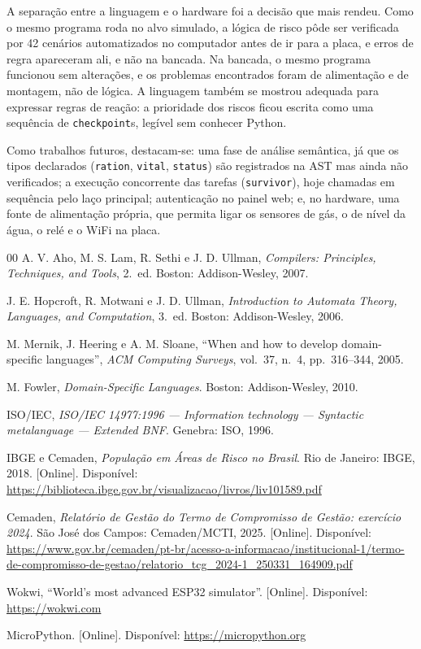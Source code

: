 \documentclass[conference]{IEEEtran}
\begin{document}
A separação entre a linguagem e o hardware foi a decisão que mais rendeu.
Como o mesmo programa roda no alvo simulado, a lógica de risco pôde ser
verificada por 42 cenários automatizados no computador antes de ir para
a placa, e erros de regra apareceram ali, e não na bancada. Na bancada, o mesmo
programa funcionou sem alterações, e os problemas encontrados foram de
alimentação e de montagem, não de lógica. A linguagem
também se mostrou adequada para expressar regras de reação: a prioridade
dos riscos ficou escrita como uma sequência de \texttt{checkpoint}s, legível
sem conhecer Python.

Como trabalhos futuros, destacam-se: uma fase de análise semântica, já que
os tipos declarados (\texttt{ration}, \texttt{vital}, \texttt{status}) são
registrados na AST mas ainda não verificados; a execução concorrente das
tarefas (\texttt{survivor}), hoje chamadas em sequência pelo laço
principal; autenticação no painel web; e, no hardware, uma fonte de
alimentação própria, que permita ligar os sensores de gás, o de nível da
água, o relé e o WiFi na placa.

\begin{thebibliography}{00}
 A. V. Aho, M. S. Lam, R. Sethi e J. D. Ullman,
\textit{Compilers: Principles, Techniques, and Tools}, 2.\ ed.
Boston: Addison-Wesley, 2007.

 J. E. Hopcroft, R. Motwani e J. D. Ullman,
\textit{Introduction to Automata Theory, Languages, and Computation},
3.\ ed. Boston: Addison-Wesley, 2006.

 M. Mernik, J. Heering e A. M. Sloane, ``When and
how to develop domain-specific languages'', \textit{ACM Computing
Surveys}, vol.~37, n.~4, pp.~316--344, 2005.

 M. Fowler, \textit{Domain-Specific Languages}.
Boston: Addison-Wesley, 2010.

 ISO/IEC, \textit{ISO/IEC 14977:1996 --- Information
technology --- Syntactic metalanguage --- Extended BNF}. Genebra: ISO,
1996.

 IBGE e Cemaden, \textit{População em Áreas de Risco no
Brasil}. Rio de Janeiro: IBGE, 2018. [Online]. Disponível:
\url{https://biblioteca.ibge.gov.br/visualizacao/livros/liv101589.pdf}

 Cemaden, \textit{Relatório de Gestão do Termo de
Compromisso de Gestão: exercício 2024}. São José dos Campos: Cemaden/MCTI,
2025. [Online]. Disponível:
\url{https://www.gov.br/cemaden/pt-br/acesso-a-informacao/institucional-1/termo-de-compromisso-de-gestao/relatorio_tcg_2024-1_250331_164909.pdf}

 Wokwi, ``World's most advanced ESP32 simulator''.
[Online]. Disponível: \url{https://wokwi.com}

 MicroPython. [Online]. Disponível:
\url{https://micropython.org}
\end{thebibliography}
\end{document}
